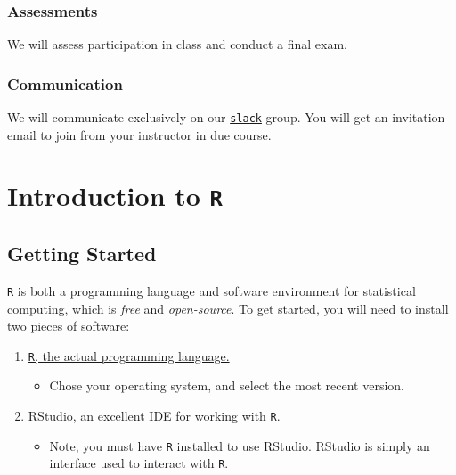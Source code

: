 \documentclass[]{book}
\providecommand{\tightlist}{%
  \setlength{\itemsep}{0pt}\setlength{\parskip}{0pt}}
\begin{document}
\hypertarget{assessments}{%
\subsection*{Assessments}\label{assessments}}

We will assess participation in class and conduct a final exam.

\hypertarget{communication}{%
\subsection*{Communication}\label{communication}}

We will communicate exclusively on our \href{https://scpomtrics.slack.com}{\texttt{slack}} group. You will get an invitation email to join from your instructor in due course.

\hypertarget{R-intro}{%
\chapter{\texorpdfstring{Introduction to \texttt{R}}{Introduction to R}}\label{R-intro}}

\hypertarget{getting-started}{%
\section{Getting Started}\label{getting-started}}

\texttt{R} is both a programming language and software environment for statistical computing, which is \emph{free} and \emph{open-source}. To get started, you will need to install two pieces of software:

\begin{enumerate}
\def\labelenumi{\arabic{enumi}.}
\tightlist
\item
  \href{https://www.r-project.org}{\texttt{R}, the actual programming language.}

  \begin{itemize}
  \tightlist
  \item
    Chose your operating system, and select the most recent version.
  \end{itemize}
\item
  \href{http://www.rstudio.com/}{RStudio, an excellent IDE for working with \texttt{R}.}

  \begin{itemize}
  \tightlist
  \item
    Note, you must have \texttt{R} installed to use RStudio. RStudio is simply an interface used to interact with \texttt{R}.
  \end{itemize}
\end{enumerate}
\end{document}
